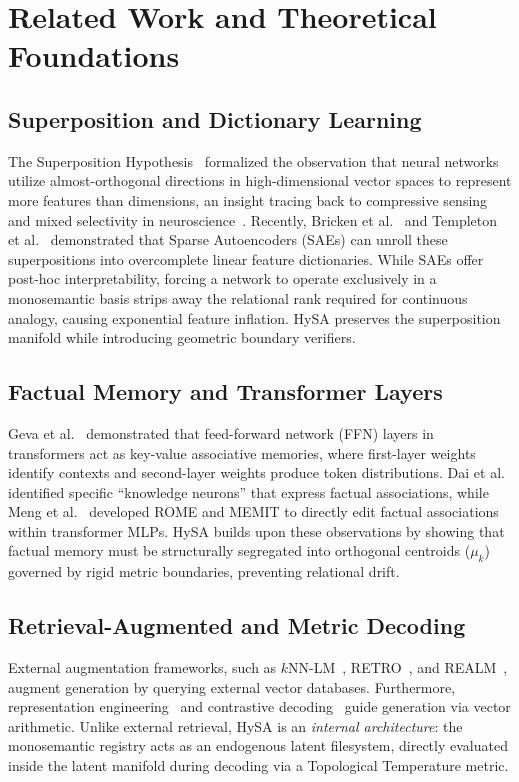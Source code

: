 \documentclass[10pt,twocolumn]{article}
\theoremstyle{definition}
\begin{document}
\section{Related Work and Theoretical Foundations}

\subsection{Superposition and Dictionary Learning}
The Superposition Hypothesis~\cite{elhage2022toy} formalized the observation that neural networks utilize almost-orthogonal directions in high-dimensional vector spaces to represent more features than dimensions, an insight tracing back to compressive sensing and mixed selectivity in neuroscience~\cite{rigotti2013importance, fusi2016why}. Recently, Bricken et al.~\cite{bricken2023monosemanticity} and Templeton et al.~\cite{templeton2024scaling} demonstrated that Sparse Autoencoders (SAEs) can unroll these superpositions into overcomplete linear feature dictionaries. While SAEs offer post-hoc interpretability, forcing a network to operate exclusively in a monosemantic basis strips away the relational rank required for continuous analogy, causing exponential feature inflation. HySA preserves the superposition manifold while introducing geometric boundary verifiers.

\subsection{Factual Memory and Transformer Layers}
Geva et al.~\cite{geva2021transformer} demonstrated that feed-forward network (FFN) layers in transformers act as key-value associative memories, where first-layer weights identify contexts and second-layer weights produce token distributions. Dai et al.~\cite{knowledge_neurons_2022} identified specific ``knowledge neurons'' that express factual associations, while Meng et al.~\cite{meng2022locating_rome, meng2022mass_memit} developed ROME and MEMIT to directly edit factual associations within transformer MLPs. HySA builds upon these observations by showing that factual memory must be structurally segregated into orthogonal centroids ($\mu_k$) governed by rigid metric boundaries, preventing relational drift.

\subsection{Retrieval-Augmented and Metric Decoding}
External augmentation frameworks, such as $k\text{NN}$-LM~\cite{khandelwal2020knn_lm}, RETRO~\cite{borgeaud2022retro}, and REALM~\cite{guu2020realm}, augment generation by querying external vector databases. Furthermore, representation engineering~\cite{zou2023representation} and contrastive decoding~\cite{li2023contrastive} guide generation via vector arithmetic. Unlike external retrieval, HySA is an \textit{internal architecture}: the monosemantic registry acts as an endogenous latent filesystem, directly evaluated inside the latent manifold during decoding via a Topological Temperature metric.
\end{document}
